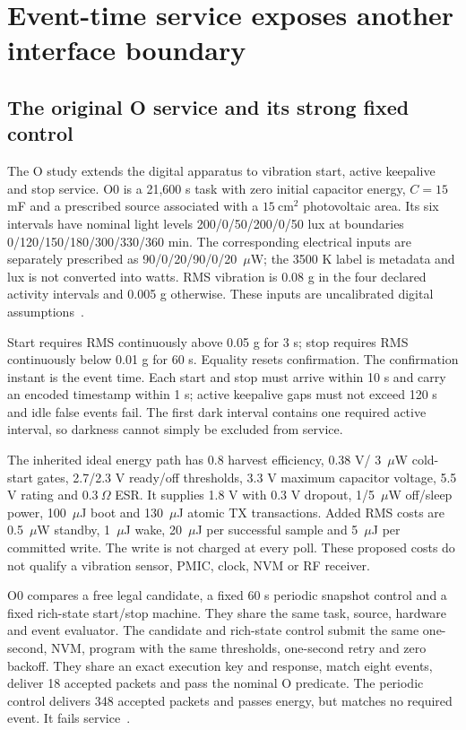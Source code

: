 \section{Event-time service exposes another interface boundary}
\subsection{The original O service and its strong fixed control}
The O study extends the digital apparatus to vibration start, active
keepalive and stop service. O0 is a 21,600 s task with zero initial
capacitor energy, $C=15$ mF and a prescribed source associated with a
$15~\mathrm{cm}^2$ photovoltaic area. Its six intervals have nominal
light levels 200/0/50/200/0/50 lux at boundaries
0/120/150/180/300/330/360 min. The corresponding electrical inputs
are separately prescribed as 90/0/20/90/0/20~$\mu$W; the 3500 K label
is metadata and lux is not converted into watts. RMS vibration is
0.08 g in the four declared activity intervals and 0.005 g otherwise.
These inputs are uncalibrated digital assumptions~\cite{otask}.

Start requires RMS continuously above 0.05 g for 3 s; stop requires
RMS continuously below 0.01 g for 60 s. Equality resets confirmation.
The confirmation instant is the event time. Each start and stop must
arrive within 10 s and carry an encoded timestamp within 1 s; active
keepalive gaps must not exceed 120 s and idle false events fail.
The first dark interval contains one required active interval, so
darkness cannot simply be excluded from service.

The inherited ideal energy path has 0.8 harvest efficiency, 0.38 V/
3~$\mu$W cold-start gates, 2.7/2.3 V ready/off thresholds, 3.3 V
maximum capacitor voltage, 5.5 V rating and $0.3~\Omega$ ESR.
It supplies 1.8 V with 0.3 V dropout, 1/5~$\mu$W off/sleep power,
100~$\mu$J boot and 130~$\mu$J atomic TX transactions. Added RMS
costs are 0.5~$\mu$W standby, 1~$\mu$J wake, 20~$\mu$J per
successful sample and 5~$\mu$J per committed write. The write is
not charged at every poll. These proposed costs do not qualify a
vibration sensor, PMIC, clock, NVM or RF receiver.

O0 compares a free legal candidate, a fixed 60 s periodic snapshot
control and a fixed rich-state start/stop machine. They share the
same task, source, hardware and event evaluator. The candidate and
rich-state control submit the same one-second, NVM,
 program with the same thresholds, one-second
retry and zero backoff. They share an exact execution key and
response, match eight events, deliver 18 accepted packets and pass
the nominal O predicate. The periodic control delivers 348 accepted
packets and passes energy, but matches no required event. It fails
service~\cite{o0}.


